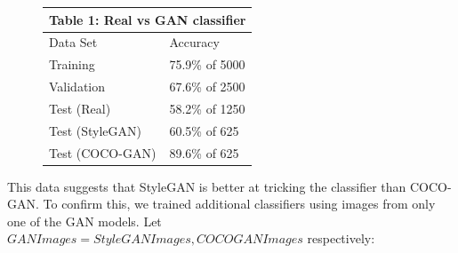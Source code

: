 \documentclass{article}
\begin{document}
        \begin{figure}[H]
            \centering
            \begin{tabular}{ |p{3cm}|p{2cm}|  }
                 \hline
                 \multicolumn{2}{|c|}{Table 1: Real vs GAN classifier} \\
                 \hline
                Data Set     & Accuracy\\
                 \hline
                Training        & 75.9\% of 5000 \\
                 \hline
                Validation      & 67.6\% of 2500 \\
                 \hline
                Test (Real)     & 58.2\% of 1250 \\
                 \hline
                Test (StyleGAN) & 60.5\% of 625  \\
                 \hline
                Test (COCO-GAN) & 89.6\% of 625 \\
                 \hline 
            \end{tabular}
        \end{figure}
        
        This data suggests that StyleGAN is better at tricking the classifier than COCO-GAN.
        To confirm this, we trained additional classifiers using images from only one of the GAN models. Let $GANImages = StyleGANImages, COCOGANImages$ respectively:
\end{document}

